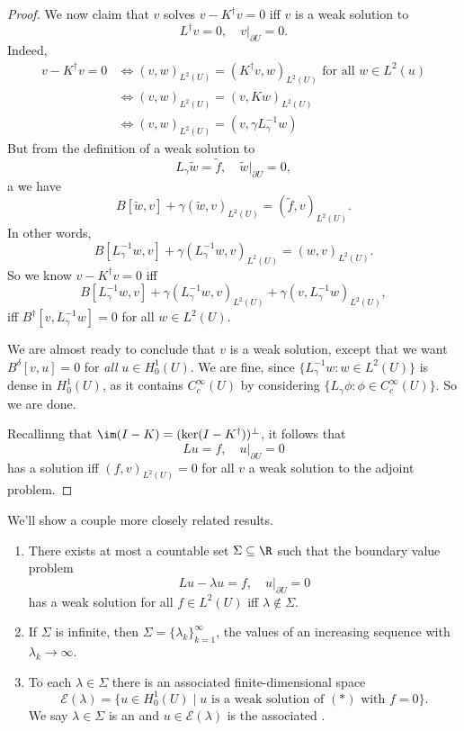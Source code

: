 \documentclass[a4paper]{article}
\begin{document}
\begin{proof}
  We now claim that $v$ solves $v - K^\dagger v = 0$ iff $v$ is a weak solution to
  \[
    L^\dagger v = 0,\quad v|_{\partial U} = 0.
  \]
  Indeed,
  \begin{align*}
    v - K^\dagger v = 0 &\Longleftrightarrow (v, w)_{L^2(U)} = (K^\dagger v, w)_{L^2(U)}\text{ for all }w \in L^2(u)\\
    &\Longleftrightarrow (v, w)_{L^2(U)} = (v, Kw)_{L^2(U)}\\
    &\Longleftrightarrow (v, w)_{L^2(U)} = (v, \gamma L_\gamma^{-1}w)
  \end{align*}
  But from the definition of a weak solution to
  \[
    L_\gamma \tilde{w} = \tilde{f},\quad \tilde{w}|_{\partial U} = 0,
  \]a
  we have
  \[
    B[\tilde{w}, v] + \gamma(\tilde{w}, v)_{L^2(U)} = (\tilde{f}, v)_{L^2(U)}.
  \]
  In other words,
  \[
    B[L_\gamma^{-1}w, v] + \gamma (L_\gamma^{-1}w, v)_{L^2(U)} = (w, v)_{L^2(U)}.
  \]
  So we know $v - K^\dagger v = 0$ iff
  \[
    B[L_\gamma^{-1}w, v] + \gamma (L_\gamma^{-1} w, v)_{L^2(U)} + \gamma (v, L_{\gamma}^{-1} w)_{L^2(U)},
  \]
  iff $B^\dagger[v, L_\gamma^{-1}w] = 0$ for all $w \in L^2(U)$.

  We are almost ready to conclude that $v$ is a weak solution, except that we want $B^\delta[v, u] = 0$ for \emph{all} $u \in H_0^1(U)$. We are fine, since $\{L_\gamma^{-1}w : w \in L^2(U)\}$ is dense in $H_0^1(U)$, as it contains $C_c^\infty(U)$ by considering $\{L_\gamma \phi: \phi \in C_c^\infty(U)\}$. So we are done.

  Recallinng that $\im (I - K) = (\ker (I - K^\dagger))^\perp$, it follows that
  \[
    Lu = f,\quad u|_{\partial U} = 0
  \]
  has a solution iff $(f, v)_{L^2(U)} = 0$ for all $v$ a weak solution to the adjoint problem. 
\end{proof}

We'll show a couple more closely related results.

\begin{thm}[Spectrum of $L$]\leavevmode
  \begin{enumerate}
    \item There exists at most a countable set $\Sigma \subseteq \R$ such that the boundary value problem
      \[
        Lu - \lambda u = f,\quad u|_{\partial U} = 0\tag{$*$}
      \]
      has a weak solution for all $f \in L^2(U)$ iff $\lambda \not \in \Sigma$.
    \item If $\Sigma$ is infinite, then $\Sigma = \{\lambda_k\}_{k = 1}^\infty$, the values of an increasing sequence with $\lambda_k \to \infty$.
    \item To each $\lambda \in \Sigma$ there is an associated finite-dimensional space
      \[
        \mathcal{E}(\lambda) = \{u \in H_0^1(U) \mid u\text{ is a weak solution of }(*)\text{ with $f = 0$}\}.
      \]
      We say $\lambda \in \Sigma$ is an  and $u \in \mathcal{E}(\lambda)$ is the associated .
  \end{enumerate}
\end{thm}
\end{document}
